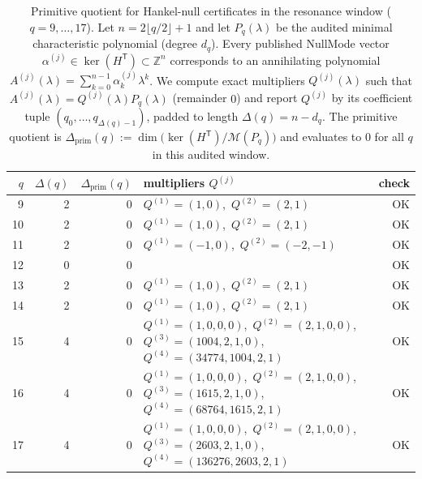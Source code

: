 \begin{table}[H]
\centering
\scriptsize
\setlength{\tabcolsep}{4pt}
\renewcommand{\arraystretch}{1.15}
\caption{Primitive quotient for Hankel-null certificates in the resonance window ($q=9,\dots,17$). Let $n=2\lfloor q/2\rfloor+1$ and let $P_q(\lambda)$ be the audited minimal characteristic polynomial (degree $d_q$). Every published NullMode vector $\alpha^{(j)}\in\ker(H^{\mathsf T})\subset\mathbb{Z}^n$ corresponds to an annihilating polynomial $A^{(j)}(\lambda)=\sum_{k=0}^{n-1}\alpha^{(j)}_k\lambda^k$. We compute exact multipliers $Q^{(j)}(\lambda)$ such that $A^{(j)}(\lambda)=Q^{(j)}(\lambda)P_q(\lambda)$ (remainder $0$) and report $Q^{(j)}$ by its coefficient tuple $(q_0,\dots,q_{\Delta(q)-1})$, padded to length $\Delta(q)=n-d_q$. The primitive quotient is $\Delta_{\mathrm{prim}}(q):=\dim\bigl(\ker(H^{\mathsf T})/\mathcal{M}(P_q)\bigr)$ and evaluates to $0$ for all $q$ in this audited window.}
\label{tab:fold_collision_resonance_nullmodes_primitive_quotient_q9_17}
\begin{tabular}{r r r l r}
\toprule
$q$ & $\Delta(q)$ & $\Delta_{\mathrm{prim}}(q)$ & multipliers $Q^{(j)}$ & check\\
\midrule
9 & 2 & 0 & $Q^{(1)}=(1,0)$,\ $Q^{(2)}=(2,1)$ & OK\\
10 & 2 & 0 & $Q^{(1)}=(1,0)$,\ $Q^{(2)}=(2,1)$ & OK\\
11 & 2 & 0 & $Q^{(1)}=(-1,0)$,\ $Q^{(2)}=(-2,-1)$ & OK\\
12 & 0 & 0 &  & OK\\
13 & 2 & 0 & $Q^{(1)}=(1,0)$,\ $Q^{(2)}=(2,1)$ & OK\\
14 & 2 & 0 & $Q^{(1)}=(1,0)$,\ $Q^{(2)}=(2,1)$ & OK\\
15 & 4 & 0 & $Q^{(1)}=(1,0,0,0)$,\ $Q^{(2)}=(2,1,0,0)$,\ $Q^{(3)}=(1004,2,1,0)$,\ $Q^{(4)}=(34774,1004,2,1)$ & OK\\
16 & 4 & 0 & $Q^{(1)}=(1,0,0,0)$,\ $Q^{(2)}=(2,1,0,0)$,\ $Q^{(3)}=(1615,2,1,0)$,\ $Q^{(4)}=(68764,1615,2,1)$ & OK\\
17 & 4 & 0 & $Q^{(1)}=(1,0,0,0)$,\ $Q^{(2)}=(2,1,0,0)$,\ $Q^{(3)}=(2603,2,1,0)$,\ $Q^{(4)}=(136276,2603,2,1)$ & OK\\
\bottomrule
\end{tabular}
\end{table}
